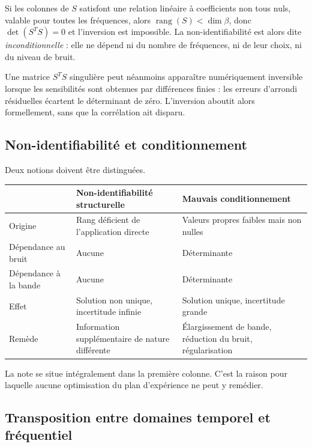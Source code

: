 \documentclass[11pt,a4paper]{article}
\begin{document}
Si les colonnes de $S$ satisfont une relation linéaire à coefficients non tous nuls, valable pour toutes
les fréquences, alors $\operatorname{rang}(S) < \dim\beta$, donc $\det\left(S^{T}S\right)=0$ et
l'inversion est impossible. La non-identifiabilité est alors dite \emph{inconditionnelle} : elle ne
dépend ni du nombre de fréquences, ni de leur choix, ni du niveau de bruit.

Une matrice $S^{T}S$ singulière peut néanmoins apparaître numériquement inversible lorsque les
sensibilités sont obtenues par différences finies : les erreurs d'arrondi résiduelles écartent le
déterminant de zéro. L'inversion aboutit alors formellement, sans que la corrélation ait disparu.

\subsection{Non-identifiabilité et conditionnement}

Deux notions doivent être distinguées.

\begin{center}
\begin{tabularx}{\textwidth}{@{}lXX@{}}
\toprule
& \textbf{Non-identifiabilité structurelle} & \textbf{Mauvais conditionnement} \\
\midrule
Origine & Rang déficient de l'application directe & Valeurs propres faibles mais non nulles \\
\addlinespace
Dépendance au bruit & Aucune & Déterminante \\
\addlinespace
Dépendance à la bande & Aucune & Déterminante \\
\addlinespace
Effet & Solution non unique, incertitude infinie & Solution unique, incertitude grande \\
\addlinespace
Remède & Information supplémentaire de nature différente & Élargissement de bande, réduction du bruit,
régularisation \\
\bottomrule
\end{tabularx}
\end{center}

La note se situe intégralement dans la première colonne. C'est la raison pour laquelle aucune
optimisation du plan d'expérience ne peut y remédier.

\subsection{Transposition entre domaines temporel et fréquentiel}
\end{document}
